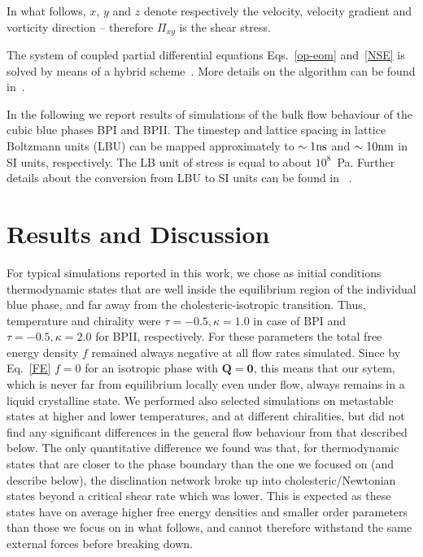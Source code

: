 \documentclass[aps,pre,reprint,superscriptaddress, twocolumn]{revtex4}
\begin{document}
\fi

In what follows, $x$, $y$ and $z$ denote respectively the velocity, velocity
gradient and vorticity direction -- therefore $\Pi_{xy}$ is the shear stress.

The system of coupled partial differential equations Eqs.~\ref{op-eom}
and~\ref{NSE} is solved by means of a
hybrid scheme~\cite{Marenduzzo:2007}. 
More details on the algorithm can
be found in~\cite{Denniston:2001, Denniston:2004}.

In the following we report results of simulations of the bulk flow behaviour of the cubic blue 
phases BPI and BPII. 
The timestep and lattice spacing in lattice Boltzmann units (LBU) can be mapped
approximately to $\sim 1 {\rm ns}$ and $\sim 10{\rm nm}$ in SI units, respectively. The LB unit of stress
is equal to about $10^8$~Pa. Further details about the conversion 
from LBU to SI units can be found in ~\cite{Henrich:2011a,Henrich:2010b}.

\section{Results and Discussion}

For typical simulations reported in this work, 
we chose as initial conditions thermodynamic states that are 
well inside the equilibrium region of the individual blue phase, and far away 
from the cholesteric-isotropic transition. Thus, temperature and chirality were 
$\tau=-0.5, \kappa=1.0$ in case of BPI and $\tau=-0.5, \kappa=2.0$ for BPII, respectively.
For these parameters the total free energy density $f$ remained always negative at all flow rates
simulated. 
Since by Eq.~\ref{FE} $f=0$ for an isotropic phase with ${\mathbf Q}={\mathbf 0}$, this means that our sytem, which is never far from equilibrium locally even under flow, always remains in a liquid crystalline state. 
We performed also selected simulations on metastable states at higher and lower temperatures, 
and at different chiralities, but did not find any significant differences in the 
general flow behaviour from that described below.
The only quantitative difference we found was that, for thermodynamic states that are closer to the phase boundary than the one we focused on (and describe below), the disclination 
network broke up into cholesteric/Newtonian states beyond a critical shear rate
which was lower. This is expected as these states have on average higher free energy densities and smaller order parameters than those we focus on in what follows, and cannot therefore withstand the same external forces before breaking down.
\end{document}
